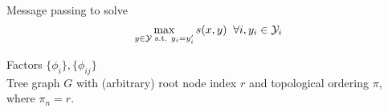 \begin{algorithm} \caption[max-marginal inference]{Message passing to solve 
$$\max_{y \in \mathcal{Y} \text{ s.t. } y_i = y_i'} s(x,y) \;\; \forall i, y_i \in \mathcal{Y}_i $$ } \label{alg:mm-inference} 

\begin{algorithmic} 

\REQUIRE $ $ \\ 
Factors $\{\phi_i\}, \{\phi_{ij}\}$\\
Tree graph $G$ with (arbitrary) root node index $r$ and topological ordering $\pi$, where $\pi_n = r$.


\end{algorithmic} 
\end{algorithm}


